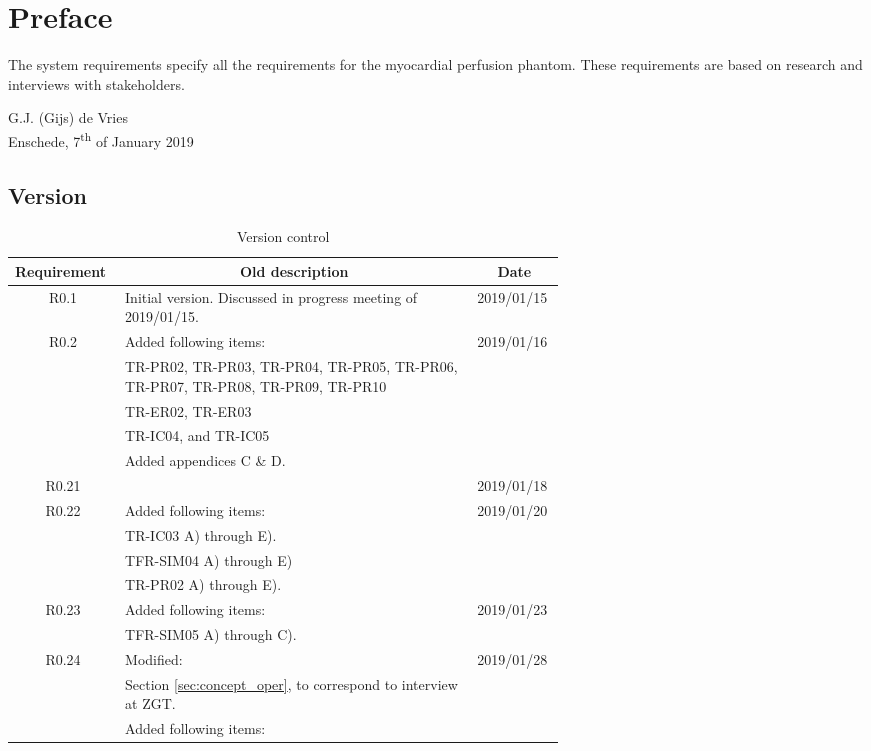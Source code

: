 \chapter*{Preface}

\vskip-10pt
The system requirements specify all the requirements for the myocardial perfusion phantom. These requirements are based on research and interviews with stakeholders.

\vskip10pt
G.J. (Gijs) de Vries\\
Enschede, 7\textsuperscript{th} of January 2019

\vskip10pt
\section*{Version}
\begin{table} [h]
\caption{ Version control }
	\begin{tabular}{|c|p{0.64\linewidth}|l|}
		\multicolumn{1}{l}{\textbf{Requirement}} & \multicolumn{1}{c}{\textbf{Old description}} & \multicolumn{1}{c}{\textbf{Date}} \\
		\hline
		R0.1 & Initial version. Discussed in progress meeting of 2019/01/15. & 2019/01/15 \\
		R0.2 & 
			Added following items: & 2019/01/16 \\
		 	& \textbullet TR-PR02, TR-PR03, TR-PR04, TR-PR05, TR-PR06, TR-PR07, TR-PR08, TR-PR09, TR-PR10 & \\
		 	& \textbullet TR-ER02, TR-ER03 & \\
		 	& \textbullet TR-IC04, and TR-IC05 & \\
		 	& \textbullet Added appendices C \& D. & \\
		 	R0.21 & & 2019/01/18 \\
		 	R0.22 & Added following items: & 2019/01/20 \\
		 	& \textbullet TR-IC03 A) through E). & \\
		 	& \textbullet TFR-SIM04 A) through E) & \\
		 	& \textbullet TR-PR02 A) through E). & \\
		 	R0.23 & Added following items: & 2019/01/23 \\
		 	& \textbullet TFR-SIM05 A) through C). & \\
		 	R0.24 & Modified: & 2019/01/28 \\
		 	& \textbullet Section \ref{sec:concept_oper}, to correspond to interview at ZGT. & \\
		 	& Added following items: & \\

\end{tabular}
\end{table}
